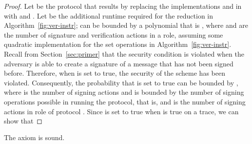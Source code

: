 \begin{proof}
Let  be the protocol that results by replacing the implementations
 and  in  with  and .
Let  be the additional runtime required
for the reduction in Algorithm~\ref{fig:ver-instr};  can be bounded by a
polynomial that is , where  and  are the number of signature and verification
actions in a role, assuming some quadratic implementation for the set operations
in Algorithm~\ref{fig:ver-instr}.
Recall from Section~\ref{sec:primer} that the  security condition
is violated when the adversary is able to create a signature of
a message that has not been signed before. Therefore, when  is set
to true, the  security of the scheme  has been violated. Consequently, the
probability that  is set to true can be bounded by ,
where  is the number of signing actions and is bounded by the number of signing
operations possible in running the protocol, that is,  and  is the number of signing actions in role  of
protocol . Since  is set to true when 
is true on a trace, we can show that

\end{proof}




\newcommand{\nonces}[1]{\mathtt{nonces}(#1)}
\begin{lemma} The axiom 
  is sound. \end{lemma}



